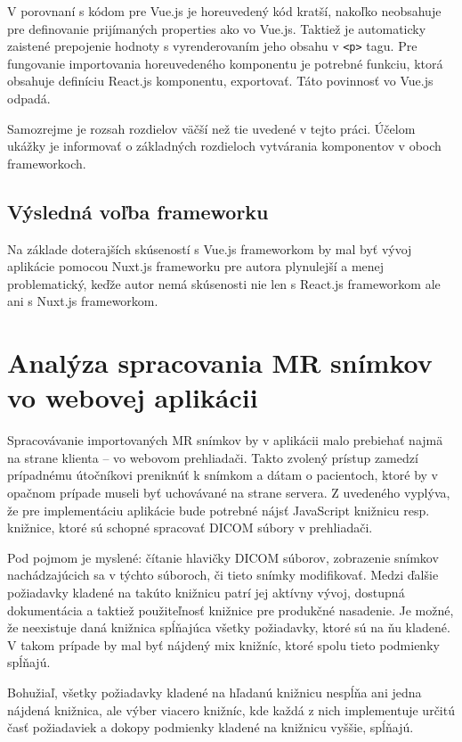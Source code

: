 V porovnaní s kódom pre Vue.js je horeuvedený kód kratší, nakoľko neobsahuje  pre definovanie prijímaných properties ako vo Vue.js. Taktiež je automaticky zaistené prepojenie hodnoty  s vyrenderovaním jeho obsahu v \texttt{<p>} tagu. Pre fungovanie importovania horeuvedeného komponentu je potrebné funkciu, ktorá obsahuje definíciu React.js komponentu, exportovať. Táto povinnosť vo Vue.js odpadá.

Samozrejme je rozsah rozdielov väčší než tie uvedené v tejto práci. Účelom ukážky je informovať o základných rozdieloch vytvárania komponentov v oboch frameworkoch.

\subsection {Výsledná voľba frameworku}
Na základe doterajších skúseností s Vue.js frameworkom by mal byť vývoj aplikácie pomocou Nuxt.js frameworku pre autora plynulejší a menej problematický, keďže autor nemá skúsenosti nie len s React.js frameworkom ale ani s Nuxt.js frameworkom.

\section {Analýza spracovania MR snímkov vo webovej aplikácii}
Spracovávanie importovaných MR snímkov by v aplikácii malo prebiehať najmä na strane klienta -- vo webovom prehliadači. Takto zvolený prístup zamedzí prípadnému útočníkovi preniknúť k snímkom a dátam o pacientoch, ktoré by v opačnom prípade museli byť uchovávané na strane servera. Z uvedeného vyplýva, že pre implementáciu aplikácie bude potrebné nájsť JavaScript knižnicu resp. knižnice, ktoré sú schopné spracovať DICOM súbory v prehliadači.

Pod pojmom  je myslené: čítanie hlavičky DICOM súborov, zobrazenie snímkov nachádzajúcich sa v týchto súboroch, či tieto snímky modifikovať. Medzi ďalšie požiadavky kladené na takúto knižnicu patrí jej aktívny vývoj, dostupná dokumentácia a taktiež použiteľnosť knižnice pre produkčné nasadenie. Je možné, že neexistuje daná knižnica spĺňajúca všetky požiadavky, ktoré sú na ňu kladené. V takom prípade by mal byť nájdený mix knižníc, ktoré spolu tieto podmienky spĺňajú.

Bohužiaľ, všetky požiadavky kladené na hľadanú knižnicu nespĺňa ani jedna nájdená knižnica, ale výber viacero knižníc, kde každá z nich implementuje určitú časť požiadaviek a dokopy podmienky kladené na knižnicu vyššie, spĺňajú.

